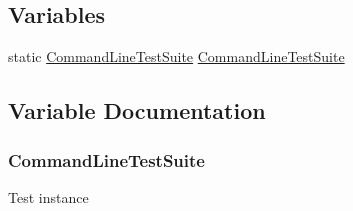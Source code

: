 \subsection*{Variables}
\begin{DoxyCompactItemize}
\item 
static \hyperlink{classCommandLineTestSuite}{Command\+Line\+Test\+Suite} \hyperlink{command-line-test-suite_8cc_aa7bcf6291771ecf8421c296665f3234d}{Command\+Line\+Test\+Suite}
\end{DoxyCompactItemize}


\subsection{Variable Documentation}
\subsubsection[{\texorpdfstring{Command\+Line\+Test\+Suite}{CommandLineTestSuite}}]{ {\bf Command\+Line\+Test\+Suite}\hspace{0.3cm}{\ttfamily [static]}}\hypertarget{command-line-test-suite_8cc_aa7bcf6291771ecf8421c296665f3234d}{}\label{command-line-test-suite_8cc_aa7bcf6291771ecf8421c296665f3234d}
Test instance 